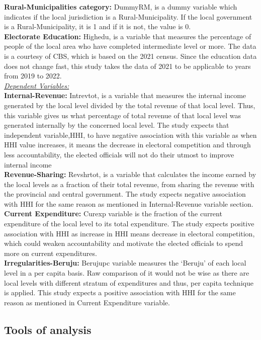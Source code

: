 \textbf{Rural-Municipalities category:} DummyRM, is a dummy variable which indicates if the local jurisdiction is a Rural-Municipality. If the local government is a Rural-Municipality, it is 1 and if it is not, the value is 0.\\
\textbf{Electorate Education:} Highedu, is a variable that measures the percentage of people of the local area who have completed intermediate level or more. The data is a courtesy of CBS, which is based on the 2021 census. Since the education data does not change fast, this study takes the data of 2021 to be applicable to years from 2019 to 2022. \\
\textit{\underline{Dependent Variables:}}\\
\textbf{Internal-Revenue:} Intrevtot, is a variable that measures the internal income generated by the local level divided by the total revenue of that local level. Thus, this variable gives us what percentage of total revenue of that local level was generated internally by the concerned local level. The study expects that independent variable,HHI, to have negative association with this variable as when HHI value increases, it means the decrease in electoral competition and through less accountability, the elected officials will not do their utmost to improve internal income \\
\textbf{Revenue-Sharing:} Revshrtot, is a variable that calculates the income earned by the local levels as a fraction of their total revenue, from sharing the revenue with the provincial and central government. The study expects negative association with HHI for the same reason as mentioned in Internal-Revenue variable section.\\
\textbf{Current Expenditure:} Curexp variable is the fraction of the current expenditure of the local level to its total expenditure. The study expects positive association with HHI as increase in HHI means decrease in electoral competition, which could weaken accountability and motivate the elected officials to spend more on current expenditures.\\
\textbf{Irregularities-Beruju:} Berujupc variable measures the `Beruju' of each local level in a per capita basis. Raw comparison of it would not be wise as there are local levels with different stratum of expenditures and thus, per capita technique is applied. This study expects a positive association with HHI for the same reason as mentioned in Current Expenditure variable.
\vspace{-3mm}
\subsection{Tools of analysis}
